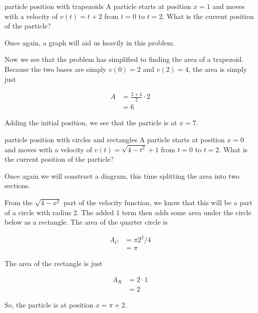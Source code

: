 \begin{example}{particle position with trapezoids}
    A particle starts at position \( x = 1 \) and moves with a velocity of \( v \left( t \right) = t + 2 \) from \( t = 0 \) to \( t = 2 \). What is the current position of the particle?

    \vspace{0.3cm}

    Once again, a graph will aid us heavily in this problem.

    \begin{figure}[H]
        \centering
        
    \end{figure}

    Now we see that the problem has simplified to finding the area of a trapezoid. Because the two bases are simply \( v \left( 0 \right) = 2 \) and \( v \left( 2 \right) = 4 \), the area is simply just

    \begin{align*}
        A &= \frac{2 + 4}{2} \cdot 2 \\
          &= 6
    \end{align*}

    Adding the initial position, we see that the particle is at \( x = 7 \).
\end{example}

\begin{example}{particle position with circles and rectangles}
    A particle starts at position \( x = 0 \) and moves with a velocity of \( v \left( t \right) = \sqrt{4 - t^2} + 1 \) from \( t = 0 \) to \( t = 2 \). What is the current position of the particle?

    \vspace{0.3cm}

    Once again we will construct a diagram, this time splitting the area into two sections.

    \begin{figure}[H]
        \centering
        
    \end{figure}

    From the \( \sqrt{4 - x^2} \) part of the velocity function, we know that this will be a part of a circle with radius \( 2 \). The added \( 1 \) term then adds some area under the circle below as a rectangle. The area of the quarter circle is

    \begin{align*}
        A_C &= \pi 2^2 / 4 \\
        &= \pi
    \end{align*}

    The area of the rectangle is just

    \begin{align*}
        A_R &= 2 \cdot 1 \\
            &= 2
    \end{align*}

    So, the particle is at position \( x = \pi + 2 \).
\end{example}

